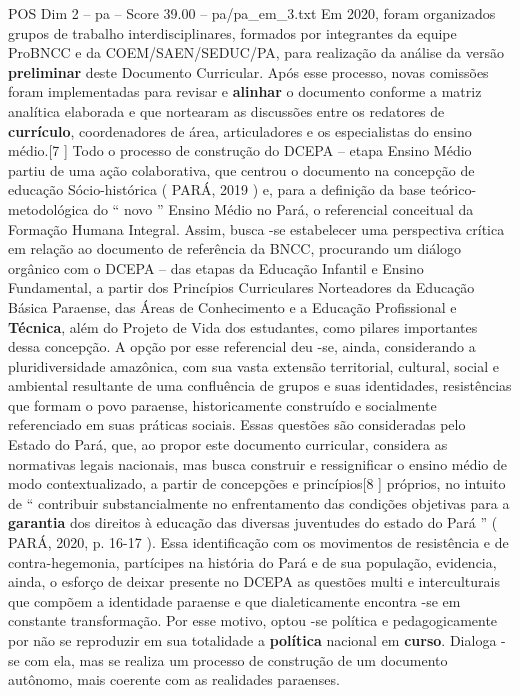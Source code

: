 \begin{textsample}{POS Dim 2 – pa – Score 39.00 – pa/pa\_em\_3.txt}
Em 2020, foram organizados grupos de trabalho interdisciplinares, formados por integrantes da equipe ProBNCC e da COEM/SAEN/SEDUC/PA, para realização da análise da versão \textbf{preliminar} deste Documento Curricular.
Após esse processo, novas comissões foram implementadas para revisar e \textbf{alinhar} o documento conforme a matriz analítica elaborada e que nortearam as discussões entre os redatores de \textbf{currículo}, coordenadores de área, articuladores e os especialistas do ensino médio.[7 ] Todo o processo de construção do DCEPA – etapa Ensino Médio partiu de uma ação colaborativa, que centrou o documento na concepção de educação Sócio-histórica ( PARÁ, 2019 ) e, para a definição da base teórico-metodológica do “ novo ” Ensino Médio no Pará, o referencial conceitual da Formação Humana Integral.
Assim, busca -se estabelecer uma perspectiva crítica em relação ao documento de referência da BNCC, procurando um diálogo orgânico com o DCEPA – das etapas da Educação Infantil e Ensino Fundamental, a partir dos Princípios Curriculares Norteadores da Educação Básica Paraense, das Áreas de Conhecimento e a Educação Profissional e \textbf{Técnica}, além do Projeto de Vida dos estudantes, como pilares importantes dessa concepção.
A opção por esse referencial deu -se, ainda, considerando a pluridiversidade amazônica, com sua vasta extensão territorial, cultural, social e ambiental resultante de uma confluência de grupos e suas identidades, resistências que formam o povo paraense, historicamente construído e socialmente referenciado em suas práticas sociais.
Essas questões são consideradas pelo Estado do Pará, que, ao propor este documento curricular, considera as normativas legais nacionais, mas busca construir e ressignificar o ensino médio de modo contextualizado, a partir de concepções e princípios[8 ] próprios, no intuito de “ contribuir substancialmente no enfrentamento das condições objetivas para a \textbf{garantia} dos direitos à educação das diversas juventudes do estado do Pará ” ( PARÁ, 2020, p. 16-17 ).
Essa identificação com os movimentos de resistência e de contra-hegemonia, partícipes na história do Pará e de sua população, evidencia, ainda, o esforço de deixar presente no DCEPA as questões multi e interculturais que compõem a identidade paraense e que dialeticamente encontra -se em constante transformação.
Por esse motivo, optou -se política e pedagogicamente por não se reproduzir em sua totalidade a \textbf{política} nacional em \textbf{curso}.
Dialoga -se com ela, mas se realiza um processo de construção de um documento autônomo, mais coerente com as realidades paraenses.

\end{textsample}
